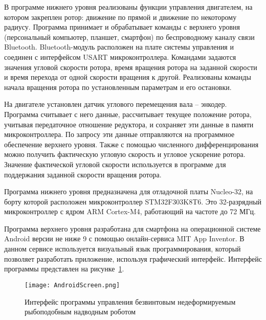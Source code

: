 В программе нижнего уровня реализованы функции управления двигателем, на котором закреплен ротор: движение по прямой и движение по некоторому радиусу. Программа принимает и обрабатывает команды с верхнего уровня (персональный компьютер, планшет, смартфон) по беспроводному каналу связи Bluetooth. Bluetooth-модуль расположен на плате системы управления и соединен с интерфейсом USART микроконтроллера. Командами задаются значения угловой скорости ротора, время вращения ротора на заданной скорости и время перехода от одной скорости вращения к другой. Реализованы команды начала вращения ротора по установленным параметрам и его остановки.

На двигателе установлен датчик углового перемещения вала – энкодер. Программа считывает с него данные, рассчитывает текущее положение ротора, учитывая передаточное отношение редуктора, и сохраняет эти данные в памяти микроконтроллера. По запросу эти данные отправляются на программное обеспечение верхнего уровня. Также с помощью численного дифференцирования можно получить фактическую угловую скорость и угловое ускорение ротора. Значение фактической угловой скорости используется в программе для поддержания заданной скорости вращения ротора.

Программа нижнего уровня предназначена для отладочной платы Nucleo-32, на борту которой расположен микроконтроллер STM32F303K8T6. Это 32-разрядный микроконтроллер с ядром ARM Cortex-M4, работающий на частоте до 72 МГц.

Программа верхнего уровня разработана для смартфона на операционной системе Android версии не ниже 9 с помощью онлайн-сервиса MIT App Inventor. В данном сервисе используется визуальный язык программирования, который позволяет разработать приложение, используя графический интерфейс. Интерфейс программы представлен на рисунке~\ref{AndroidScreen}.



\begin{figure}[!h]
	\centering
	\texttt{[image: AndroidScreen.png]}
	\caption{Интерфейс программы управления безвинтовым недеформируемым рыбоподобным надводным роботом}
	\label{AndroidScreen}
\end{figure}

